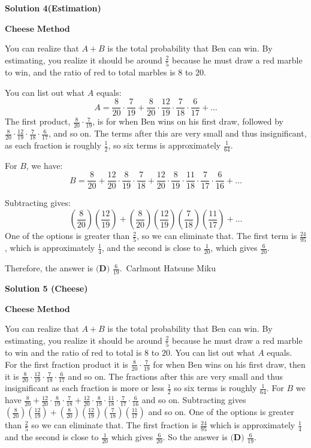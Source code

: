 \begin{enumerate}
\textbf{Solution 4(Estimation)}

$\textbf{Cheese Method}$

 You can realize that $A + B$ is the total probability that Ben can win. By estimating, you realize it should be around $\frac{2}{5}$ because he must draw a red marble to win, and the ratio of red to total marbles is $8$ to $20$. 

 You can list out what $A$ equals:
 \[A = \frac{8}{20} \cdot \frac{7}{19} + \frac{8}{20} \cdot \frac{12}{19} \cdot \frac{7}{18} \cdot \frac{6}{17} + \dots\]The first product, $\frac{8}{20} \cdot \frac{7}{19}$, is for when Ben wins on his first draw, followed by $\frac{8}{20} \cdot \frac{12}{19} \cdot \frac{7}{18} \cdot \frac{6}{17}$, and so on. The terms after this are very small and thus insignificant, as each fraction is roughly $\frac{1}{2}$, so six terms is approximately $\frac{1}{64}$. 

 For $B$, we have:
 \[B = \frac{8}{20} + \frac{12}{20} \cdot \frac{8}{19} \cdot \frac{7}{18} + \frac{12}{20} \cdot \frac{8}{19} \cdot \frac{11}{18} \cdot \frac{7}{17} \cdot \frac{6}{16} + \dots\]

 Subtracting gives:
 \[\left(\frac{8}{20}\right)\left(\frac{12}{19}\right) + \left(\frac{8}{20}\right)\left(\frac{12}{19}\right)\left(\frac{7}{18}\right)\left(\frac{11}{17}\right) + \dots\]One of the options is greater than $\frac{2}{5}$, so we can eliminate that. The first term is $\frac{24}{95}$, which is approximately $\frac{1}{4}$, and the second is close to $\frac{1}{20}$, which gives $\frac{6}{20}$. 

 Therefore, the answer is $\boxed{\textbf{(D) }\frac{6}{19}}$.~Carlmont Hatsune Miku

 



\textbf{Solution 5 (Cheese)}

$\textbf{Cheese Method}$

 You can realize that $A+B$ is the total probability that Ben can win. By estimating, you realize it should be around $\frac{2}{5}$ because he must draw a red marble to win and the ratio of red to total is $8$ to $20$. You can list out what $A$ equals. For the first fraction product it is $\frac{8}{20} \cdot \frac{7}{19}$ for when Ben wins on his first draw, then it is $\frac{8}{20} \cdot \frac{12}{19} \cdot \frac{7}{18} \cdot \frac{6}{17}$ and so on. The fractions after this are very small and thus insignificant as each fraction is more or less $\frac{1}{2}$ so six terms is roughly $\frac{1}{64}$. For $B$ we have $\frac{8}{20} + \frac{12}{20} \cdot \frac{8}{19} \cdot \frac{7}{18} + \frac{12}{20} \cdot \frac{8}{19} \cdot \frac{11}{18} \cdot \frac{7}{17} \cdot \frac{6}{16}$ and so on. Subtracting gives $\left(\frac{8}{20}\right)\left(\frac{12}{19}\right) + \left(\frac{8}{20}\right)\left(\frac{12}{19}\right)\left(\frac{7}{18}\right)\left(\frac{11}{17}\right)$ and so on. One of the options is greater than $\frac{2}{5}$ so we can eliminate that. The first fraction is $\frac{24}{95}$ which is approximately $\frac{1}{4}$ and the second is close to $\frac{1}{20}$ which gives $\frac{6}{20}$. So the answer is $\boxed{\textbf{(D) }\frac{6}{19}}$.


\end{enumerate}
